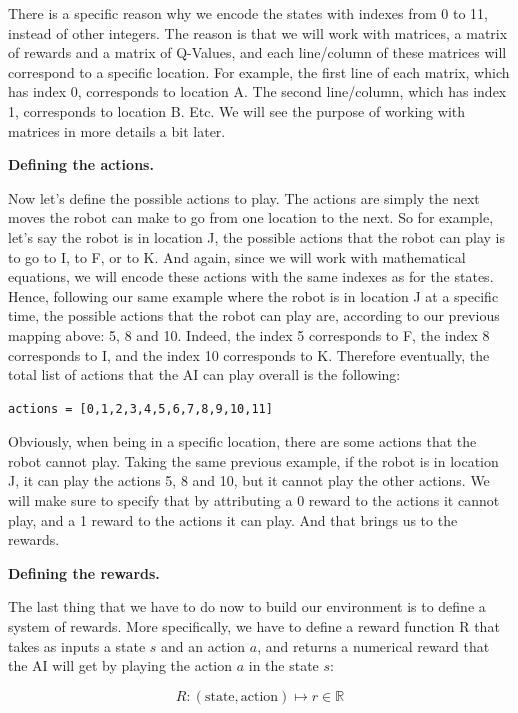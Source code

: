 \documentclass[]{book}
\begin{document}
There is a specific reason why we encode the states with indexes from 0 to 11, instead of other integers. The reason is that we will work with matrices, a matrix of rewards and a matrix of Q-Values, and each line/column of these matrices will correspond to a specific location. For example, the first line of each matrix, which has index 0, corresponds to location A. The second line/column, which has index 1, corresponds to location B. Etc. We will see the purpose of working with matrices in more details a bit later.

\textbf{Defining the actions.}

Now let's define the possible actions to play. The actions are simply the next moves the robot can make to go from one location to the next. So for example, let's say the robot is in location J, the possible actions that the robot can play is to go to I, to F, or to K. And again, since we will work with mathematical equations, we will encode these actions with the same indexes as for the states. Hence, following our same example where the robot is in location J at a specific time, the possible actions that the robot can play are, according to our previous mapping above: 5, 8 and 10. Indeed, the index 5 corresponds to F, the index 8 corresponds to I, and the index 10 corresponds to K. Therefore eventually, the total list of actions that the AI can play overall is the following:

\begin{lstlisting}
actions = [0,1,2,3,4,5,6,7,8,9,10,11]
\end{lstlisting}

Obviously, when being in a specific location, there are some actions that the robot cannot play. Taking the same previous example, if the robot is in location J, it can play the actions 5, 8 and 10, but it cannot play the other actions. We will make sure to specify that by attributing a 0 reward to the actions it cannot play, and a 1 reward to the actions it can play. And that brings us to the rewards.

\textbf{Defining the rewards.}

The last thing that we have to do now to build our environment is to define a system of rewards. More specifically, we have to define a reward function R that takes as inputs a state \(s\) and an action \(a\), and returns a numerical reward that the AI will get by playing the action \(a\) in the state \(s\):

\begin{equation*}
R : (\textrm{state}, \textrm{action}) \mapsto r \in \mathbb{R}
\end{equation*}
\end{document}
